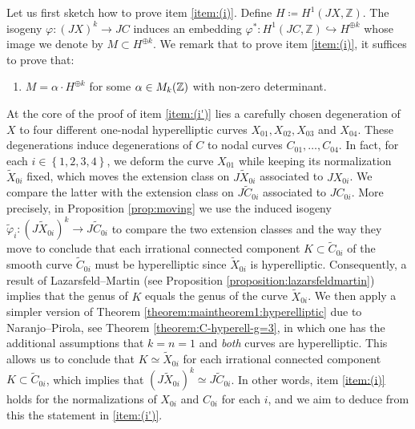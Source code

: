 \documentclass[a4paper,11pt,reqno]{amsart}
\numberwithin{equation}{section}
\theoremstyle{plain}
\theoremstyle{definition}
\newcommand{\Z}{\mathbb Z}
\let\rm\relax
\newcommand{\rm}[1]{{\mathrm{#1}}}
\newcommand{\wt}[1]{{\widetilde{#1}}}
\renewcommand{\cong}{\simeq}
\newcommand{\set}[1]{\left\{ #1 \right\}}
\begin{document}
Let us first sketch how to prove item \ref{item:(i)}. Define $H \coloneqq H^1(JX,\Z)$. The isogeny $\varphi \colon (JX)^k \to JC$ induces an embedding $\varphi^\ast \colon H^1(JC,\Z) \hookrightarrow H^{\oplus k}$ whose image we denote by $M \subset H^{\oplus k}$. We remark that to prove item \ref{item:(i)}, it suffices to prove that:
\begin{enumerate} [label=(\roman*')]
\item $M = \alpha \cdot H^{\oplus k}$ for some $\alpha \in \rm{M}_k(\Z)$ with non-zero determinant.\label{item:(i')}
\end{enumerate}
At the core of the proof of item \ref{item:(i')} lies a carefully chosen degeneration of  
 $X$ to four different one-nodal hyperelliptic curves $X_{01}, X_{02}, X_{03}$ and $X_{04}$. These degenerations induce degenerations of $C$ to nodal curves $C_{01}, \dotsc, C_{04}$. In fact, for each $i \in \set{1,2,3,4}$, we deform the curve $X_{01}$ while keeping its normalization $\wt X_{0i}$ fixed, which moves the extension class on $J \wt X_{0i}$ associated to $J X_{0i}$. 
 We compare the latter with the extension class on $J\wt C_{0i}$ associated to $JC_{0i}$. More precisely, in Proposition \ref{prop:moving} we use the induced isogeny $\wt \varphi_i \colon (J\wt X_{0i})^k \to J \wt C_{0i}$ to compare the two extension classes and the way they move to conclude that each irrational connected component $K \subset \wt C_{0i}$ of the smooth curve $\wt C_{0i}$ must be hyperelliptic since $\wt X_{0i}$ is hyperelliptic. 
 Consequently, a result of Lazarsfeld--Martin (see Proposition \ref{proposition:lazarsfeldmartin}) implies that the genus of $K$ equals the genus of the curve $\wt X_{0i}$. 
 We then apply a simpler version of Theorem \ref{theorem:maintheorem1:hyperelliptic} due to Naranjo--Pirola, see Theorem \ref{theorem:C-hyperell-g=3}, in which one has the additional assumptions that $k = n = 1$ and \emph{both} curves are hyperelliptic. 
 This allows us to conclude that $K \cong \wt X_{0i}$ for each irrational connected component $K \subset \wt C_{0i}$, which implies that $(J\wt X_{0i})^k \cong J\wt C_{0i}$.
 In other words, item \ref{item:(i)} holds for the normalizations of $X_{0i}$ and $C_{0i}$ for each $i$, and we aim to deduce from this the statement in \ref{item:(i')}. 
\end{document}
